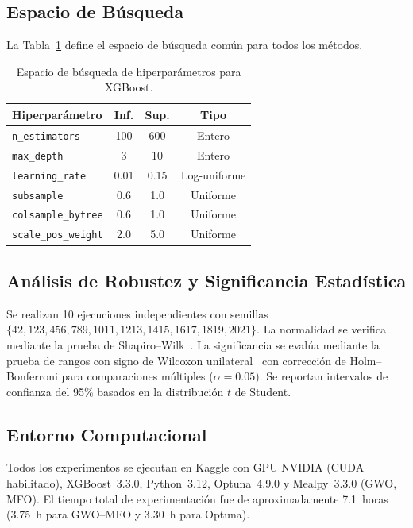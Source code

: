 \documentclass[journal]{IEEEtran}
\begin{document}
\subsection{Espacio de Búsqueda}
La Tabla~\ref{tab:space} define el espacio de búsqueda común para todos los métodos.

\begin{table}[!t]
\caption{Espacio de búsqueda de hiperparámetros para XGBoost.}
\label{tab:space}
\centering
\begin{tabular}{lccc}
\toprule
Hiperparámetro & Inf. & Sup. & Tipo \\
\midrule
\texttt{n\_estimators} & 100 & 600 & Entero \\
\texttt{max\_depth} & 3 & 10 & Entero \\
\texttt{learning\_rate} & 0.01 & 0.15 & Log-uniforme \\
\texttt{subsample} & 0.6 & 1.0 & Uniforme \\
\texttt{colsample\_bytree} & 0.6 & 1.0 & Uniforme \\
\texttt{scale\_pos\_weight} & 2.0 & 5.0 & Uniforme \\
\bottomrule
\end{tabular}
\end{table}

\subsection{Análisis de Robustez y Significancia Estadística}
Se realizan 10 ejecuciones independientes con semillas $\{42, 123, 456, 789, 1011, 1213, 1415, 1617, 1819, 2021\}$. La normalidad se verifica mediante la prueba de Shapiro--Wilk~\cite{wilcoxon1945}. La significancia se evalúa mediante la prueba de rangos con signo de Wilcoxon unilateral~\cite{wilcoxon1945, demsar2006} con corrección de Holm--Bonferroni para comparaciones múltiples ($\alpha = 0.05$). Se reportan intervalos de confianza del 95\% basados en la distribución $t$ de Student.

\subsection{Entorno Computacional}
Todos los experimentos se ejecutan en Kaggle con GPU NVIDIA (CUDA habilitado), XGBoost~3.3.0, Python~3.12, Optuna~4.9.0 y Mealpy~3.3.0 (GWO, MFO). El tiempo total de experimentación fue de aproximadamente 7.1~horas (3.75~h para GWO--MFO y 3.30~h para Optuna).

\end{document}
